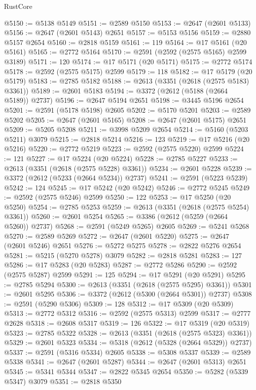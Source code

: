 \begin{lexlean}{RustCore}
\begin{coremodule}
@5150 := @5138 @5149
@5151 := @2589 @5150
@5153 := @2647 (@2601 @5133)
@5156 := @2647 (@2601 @5143) @2651
@5157 := @5153 @5156
@5159 := @2880 @5157 @2654
@5160 := @2818 @5159
@5161 := 119
@5164 := @17 @5161 (@20 @5161)
@5165 := @2772 @5164
@5170 := @2591 (@2592 (@2575 @5165) @2599 @3189)
@5171 := 120
@5174 := @17 @5171 (@20 @5171)
@5175 := @2772 @5174
@5178 := @2592 (@2575 @5175) @2599
@5179 := 118
@5182 := @17 @5179 (@20 @5179)
@5183 := @2785 @5182
@5188 := @2613 (@3351 (@2618 (@2575 @5183) @3361))
@5189 := @2601 @5183
@5194 := @3372 (@2612 (@5188 (@2664 @5189)) @2737)
@5196 := @2647 @5194 @2651
@5198 := @3445 @5196 @2654
@5201 := @2591 (@5178 @5198) @2605
@5202 := @5170 @5201
@5203 := @2589 @5202
@5205 := @2647 (@2601 @5165)
@5208 := @2647 (@2601 @5175) @2651
@5209 := @5205 @5208
@5211 := @3998 @5209 @2654
@5214 := @5160 (@5203 @5211) @3079
@5215 := @2818 @5214
@5216 := 123
@5219 := @17 @5216 (@20 @5216)
@5220 := @2772 @5219
@5223 := @2592 (@2575 @5220) @2599
@5224 := 121
@5227 := @17 @5224 (@20 @5224)
@5228 := @2785 @5227
@5233 := @2613 (@3351 (@2618 (@2575 @5228) @3361))
@5234 := @2601 @5228
@5239 := @3372 (@2612 (@5233 (@2664 @5234)) @2737)
@5241 := @2591 (@5223 @5239)
@5242 := 124
@5245 := @17 @5242 (@20 @5242)
@5246 := @2772 @5245
@5249 := @2592 (@2575 @5246) @2599
@5250 := 122
@5253 := @17 @5250 (@20 @5250)
@5254 := @2785 @5253
@5259 := @2613 (@3351 (@2618 (@2575 @5254) @3361))
@5260 := @2601 @5254
@5265 := @3386 (@2612 (@5259 (@2664 @5260)) @2737)
@5268 := @2591 (@5249 @5265) @2605
@5269 := @5241 @5268
@5270 := @2589 @5269
@5272 := @2647 (@2601 @5220)
@5275 := @2647 (@2601 @5246) @2651
@5276 := @5272 @5275
@5278 := @2822 @5276 @2654
@5281 := @5215 (@5270 @5278) @3079
@5282 := @2818 @5281
@5283 := 127
@5286 := @17 @5283 (@20 @5283)
@5287 := @2772 @5286
@5290 := @2592 (@2575 @5287) @2599
@5291 := 125
@5294 := @17 @5291 (@20 @5291)
@5295 := @2785 @5294
@5300 := @2613 (@3351 (@2618 (@2575 @5295) @3361))
@5301 := @2601 @5295
@5306 := @3372 (@2612 (@5300 (@2664 @5301)) @2737)
@5308 := @2591 (@5290 @5306)
@5309 := 128
@5312 := @17 @5309 (@20 @5309)
@5313 := @2772 @5312
@5316 := @2592 (@2575 @5313) @2599
@5317 := @2777 @2628
@5318 := @2608 @5317
@5319 := 126
@5322 := @17 @5319 (@20 @5319)
@5323 := @2785 @5322
@5328 := @2613 (@3351 (@2618 (@2575 @5323) @3361))
@5329 := @2601 @5323
@5334 := @5318 (@2612 (@5328 (@2664 @5329)) @2737)
@5337 := @2591 (@5316 @5334) @2605
@5338 := @5308 @5337
@5339 := @2589 @5338
@5341 := @2647 (@2601 @5287)
@5344 := @2647 (@2601 @5313) @2651
@5345 := @5341 @5344
@5347 := @2822 @5345 @2654
@5350 := @5282 (@5339 @5347) @3079
@5351 := @2818 @5350

\end{coremodule}
\end{lexlean}
